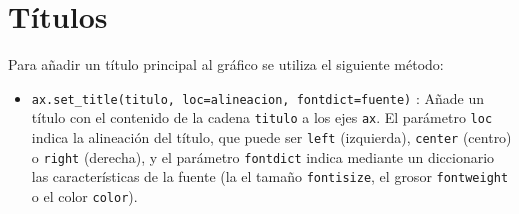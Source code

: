 \documentclass[
  spanish,
  a4paper,
]{scrreport}
\providecommand{\tightlist}{%
  \setlength{\itemsep}{0pt}\setlength{\parskip}{0pt}}
\begin{document}
\section{Títulos}\label{tuxedtulos}

Para añadir un título principal al gráfico se utiliza el siguiente
método:

\begin{itemize}
\tightlist
\item
  \texttt{ax.set\_title(titulo,\ loc=alineacion,\ fontdict=fuente)} :
  Añade un título con el contenido de la cadena \texttt{titulo} a los
  ejes \texttt{ax}. El parámetro \texttt{loc} indica la alineación del
  título, que puede ser
  \texttt{\textquotesingle{}left\textquotesingle{}} (izquierda),
  \texttt{\textquotesingle{}center\textquotesingle{}} (centro) o
  \texttt{\textquotesingle{}right\textquotesingle{}} (derecha), y el
  parámetro \texttt{fontdict} indica mediante un diccionario las
  características de la fuente (la el tamaño \texttt{fontisize}, el
  grosor \texttt{fontweight} o el color \texttt{color}).
\end{itemize}
\end{document}

